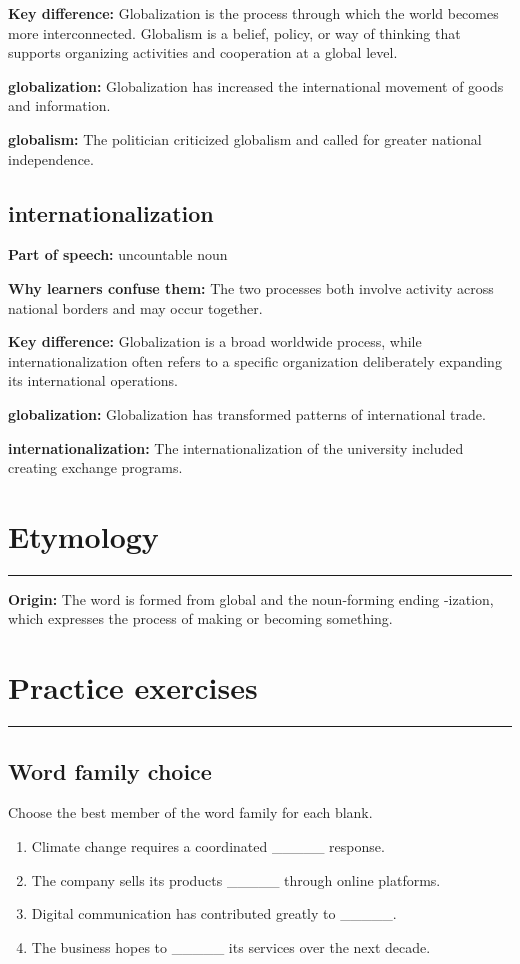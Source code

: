 \documentclass[11pt]{article}
\newcommand{\sectionrule}{\par\vspace{-0.5em}\noindent\textcolor{Accent}{\rule{\linewidth}{0.6pt}}\par}
\begin{document}
\textbf{Key difference:} Globalization is the process through which the world becomes more interconnected. Globalism is a belief, policy, or way of thinking that supports organizing activities and cooperation at a global level.

\textbf{globalization:} Globalization has increased the international movement of goods and information.

\textbf{globalism:} The politician criticized globalism and called for greater national independence.

\subsection{internationalization}
\textbf{Part of speech:} uncountable noun

\textbf{Why learners confuse them:} The two processes both involve activity across national borders and may occur together.

\textbf{Key difference:} Globalization is a broad worldwide process, while internationalization often refers to a specific organization deliberately expanding its international operations.

\textbf{globalization:} Globalization has transformed patterns of international trade.

\textbf{internationalization:} The internationalization of the university included creating exchange programs.

\section{Etymology}
\sectionrule
\textbf{Origin:} The word is formed from global and the noun-forming ending -ization, which expresses the process of making or becoming something.

\section{Practice exercises}
\sectionrule
\subsection{Word family choice}
Choose the best member of the word family for each blank.

\begin{enumerate}
  \item Climate change requires a coordinated \_\_\_\_\_ response.
  \item The company sells its products \_\_\_\_\_ through online platforms.
  \item Digital communication has contributed greatly to \_\_\_\_\_.
  \item The business hopes to \_\_\_\_\_ its services over the next decade.
\end{enumerate}
\end{document}
